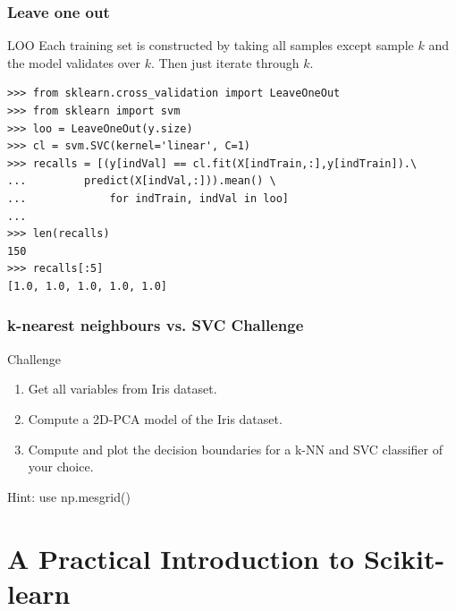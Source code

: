 \documentclass[10pt, colorlinks]{beamer}
\begin{document}
\begin{frame}[fragile]\frametitle{Leave one out}
\begin{block}{LOO}
Each training set is constructed  by taking all samples except sample $k$ and the model validates over $k$. Then just iterate through $k$. 
\end{block}
\begin{verbatim}
>>> from sklearn.cross_validation import LeaveOneOut
>>> from sklearn import svm
>>> loo = LeaveOneOut(y.size)
>>> cl = svm.SVC(kernel='linear', C=1)
>>> recalls = [(y[indVal] == cl.fit(X[indTrain,:],y[indTrain]).\
...         predict(X[indVal,:])).mean() \
...             for indTrain, indVal in loo]
... 
>>> len(recalls)
150
>>> recalls[:5]
[1.0, 1.0, 1.0, 1.0, 1.0]
\end{verbatim}

\end{frame}


\begin{frame}[fragile]\frametitle{k-nearest neighbours vs. SVC Challenge}
\begin{block}{Challenge}
\begin{enumerate}
    \item Get all variables from Iris dataset.
    \item Compute a 2D-PCA model of the Iris dataset.
    \item Compute and plot the decision boundaries for a k-NN and SVC classifier of your choice.   
 
\end{enumerate}
\end{block}

Hint: use np.mesgrid() 
\end{frame}







\section{A Practical Introduction to Scikit-learn} %
\label{sec:A Practical Introduction to Scikit-learn}
\end{document}

